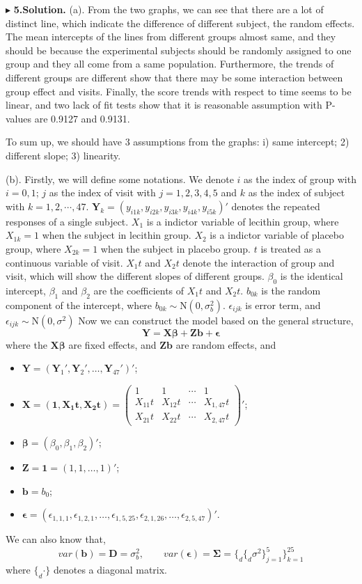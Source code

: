 \documentclass[letterpaper, 12pt]{article}
\newcommand{\lma}{\left(\begin{matrix}}
\newcommand{\rma}{\end{matrix}\right)}
\begin{document}
$\blacktriangleright$ \textbf{5.\quad Solution.}
(a). From the two graphs, we can see that there are a lot of distinct line, which indicate the difference of different subject, the random effects. The mean intercepts of the lines from different groups almost same, and they should be because the experimental subjects should be randomly assigned to one group and they all come from a same population. Furthermore, the trends of different groups are different show that there may be some interaction between group effect and visits. Finally, the score trends with respect to time seems to be linear, and two lack of fit tests show that it is reasonable assumption with P-values are 0.9127 and 0.9131.

To sum up, we should have 3 assumptions from the graphs: i) same intercept; 2) different slope; 3) linearity.





(b). Firstly, we will define some notations. We denote $i$ as the index of group with $i=0,1$; $j$ as the index of visit with $j=1,2,3,4,5$ and $k$ as the index of subject with $k=1,2,\cdots,47$. $\bm{Y}_{k}=(y_{i1k},y_{i2k},y_{i3k},y_{i4k},y_{i5k})'$ denotes the repeated responses of a single subject. $X_1$ is a indictor variable of lecithin group, where $X_{1k}=1$ when the subject in lecithin group. $X_2$ is a indictor variable of placebo group, where $X_{2k}=1$ when the subject in placebo group. $t$ is treated as a continuous variable of visit. $X_1t$  and $X_2t$ denote the interaction of group and visit, which will show the different slopes of different groups. $\beta_0$ is the identical intercept, $\beta_1$ and $\beta_2$ are the coefficients of $X_1t$  and $X_2t$. $b_{0k}$ is the random component of the intercept, where $b_{0k}\sim \text{N}(0,\sigma_b^2)$. $\epsilon_{ijk}$ is error term, and $\epsilon_{ijk}\sim \text{N}(0,\sigma^2)$ Now we can construct the model based on the general structure,
$$
\bm{Y}=\bm{X\beta+Zb+\epsilon}
$$
where the $\bm{X\beta}$ are fixed effects, and $\bm{Zb}$ are random effects, and 
\begin{itemize}
\item $\bm{Y}=(\bm{Y}_1',\bm{Y}_2',\dots,\bm{Y}_{47}')'$;
\item $\bm{X}=(\bm{1},\bm{X_1t},\bm{X_2t})=\lma
1&1&\cdots&1\\
X_{11}t&X_{12}t&\cdots&X_{1,47}t\\
X_{21}t&X_{22}t&\cdots&X_{2,47}t\rma'$;

\item $\bm{\beta}=(\beta_0,\beta_1,\beta_2)'$;
\item $\bm{Z}=\bm{1}=(1,1,\dots,1)'$;
\item $\bm{b}=b_0$;
\item $\bm{\epsilon}=(\epsilon_{1,1,1},\epsilon_{1,2,1},\dots,\epsilon_{1,5,25},\epsilon_{2,1,26},\dots,\epsilon_{2,5,47})'$.
\end{itemize}
We can also know that,
$$
var(\bm{b})=\bm{D}=\sigma_b^2,\qquad var(\bm{\epsilon})=\bm{\Sigma}=\big\{_d\{_d \sigma^2\}_{j=1}^5\big\}_{k=1}^{25}
$$
where $\{_d \cdot\}$ denotes a diagonal matrix.
\end{document}
